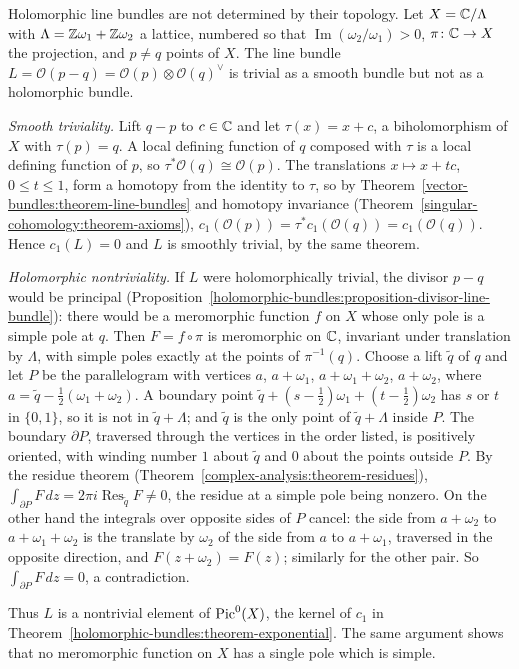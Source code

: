 \begin{counterexample}\label{holomorphic-bundles:counterexample-topologically-trivial}
Holomorphic line bundles are not determined by their topology. Let $X = \mathbb{C}/\Lambda$ with $\Lambda = \mathbb{Z}\omega_1 + \mathbb{Z}\omega_2$ a lattice, numbered so that $\operatorname{Im}(\omega_2/\omega_1) > 0$, $\pi \colon \mathbb{C} \to X$ the projection, and $p \neq q$ points of $X$. The line bundle
$L = \mathcal{O}(p - q) = \mathcal{O}(p) \otimes \mathcal{O}(q)^\vee$ is trivial as a smooth bundle but not as a holomorphic bundle.

\emph{Smooth triviality.} Lift $q - p$ to $c \in \mathbb{C}$ and let $\tau(x) = x + c$, a biholomorphism of $X$ with $\tau(p) = q$. A local defining function of $q$ composed with $\tau$ is a local defining function of $p$, so
$\tau^*\mathcal{O}(q) \cong \mathcal{O}(p)$. The translations $x \mapsto x + tc$, $0 \leq t \leq 1$, form a homotopy from the identity to $\tau$, so by Theorem~\ref{vector-bundles:theorem-line-bundles} and homotopy
invariance (Theorem~\ref{singular-cohomology:theorem-axioms}), $c_1(\mathcal{O}(p)) = \tau^*c_1(\mathcal{O}(q)) = c_1(\mathcal{O}(q))$. Hence $c_1(L) = 0$ and $L$ is smoothly trivial, by the same theorem.

\emph{Holomorphic nontriviality.} If $L$ were holomorphically trivial, the divisor $p - q$ would be principal (Proposition~\ref{holomorphic-bundles:proposition-divisor-line-bundle}): there would be a meromorphic
function $f$ on $X$ whose only pole is a simple pole at $q$. Then $F = f \circ \pi$ is meromorphic on $\mathbb{C}$, invariant under translation by $\Lambda$, with simple poles exactly at the points of $\pi^{-1}(q)$. Choose a lift
$\tilde q$ of $q$ and let $P$ be the parallelogram with vertices $a$, $a + \omega_1$, $a + \omega_1 + \omega_2$, $a + \omega_2$, where $a = \tilde q - \frac12(\omega_1 + \omega_2)$. A boundary point
$\tilde q + (s - \frac12)\omega_1 + (t - \frac12)\omega_2$ has $s$ or $t$ in $\{0, 1\}$, so it is not in $\tilde q + \Lambda$; and $\tilde q$ is the only point of $\tilde q + \Lambda$ inside $P$. The boundary $\partial P$, traversed through the vertices in the order listed, is positively oriented, with winding number $1$ about
$\tilde q$ and $0$ about the points outside $P$. By the residue theorem
(Theorem~\ref{complex-analysis:theorem-residues}), $\int_{\partial P}F\,dz = 2\pi i\operatorname{Res}_{\tilde q}F \neq 0$, the residue at a simple pole being nonzero. On the other hand the integrals over opposite sides of $P$
cancel: the side from $a + \omega_2$ to $a + \omega_1 + \omega_2$ is the translate by $\omega_2$ of the side from $a$ to $a + \omega_1$, traversed in the opposite direction, and $F(z + \omega_2) = F(z)$; similarly for the
other pair. So $\int_{\partial P}F\,dz = 0$, a contradiction.

Thus $L$ is a nontrivial element of $\operatorname{Pic}^0(X)$, the kernel of $c_1$ in Theorem~\ref{holomorphic-bundles:theorem-exponential}. The same argument shows that no meromorphic function on $X$ has a single pole which is simple.
\end{counterexample}

